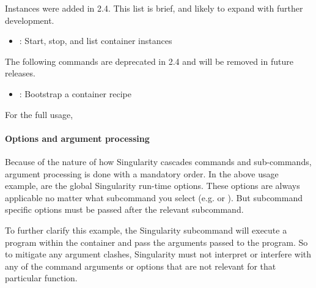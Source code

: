 \documentclass[letterpaper,10pt,english]{sphinxmanual}
\begin{document}

Instances were added in 2.4. This list is brief, and likely to expand
with further development.
\begin{itemize}
\item {} 
{\hyperref[\detokenize{running_services:running-services}]{}} : Start, stop, and list container instances

\end{itemize}

The following commands are deprecated in 2.4 and will be removed in
future releases.
\begin{itemize}
\item {} 
{\hyperref[\detokenize{appendix:bootstrap}]{}} : Bootstrap a container recipe

\end{itemize}

For the full usage, {\hyperref[\detokenize{appendix:command-usage}]{}}


\paragraph{Options and argument processing}
\label{\detokenize{appendix:options-and-argument-processing}}
Because of the nature of how Singularity cascades commands and
sub-commands, argument processing is done with a mandatory order.
 In the
above usage example,  are the global Singularity run-time options.
These options are always applicable no matter what subcommand you
select (e.g.  or  ). But subcommand specific options must be passed
after the relevant subcommand.

To further clarify this example, the  Singularity subcommand will
execute a program within the container and pass the arguments passed
to the program. So to mitigate any argument clashes, Singularity must
not interpret or interfere with any of the command arguments or
options that are not relevant for that particular function.
\end{document}
